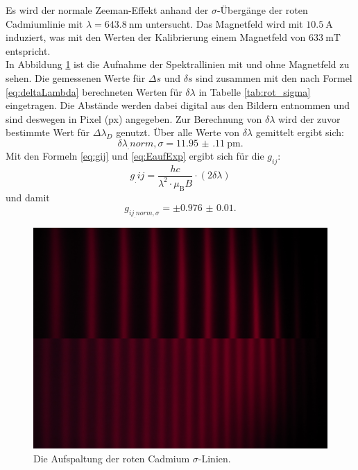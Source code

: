 Es wird der normale Zeeman-Effekt anhand der $\sigma$-Übergänge der roten Cadmiumlinie mit $\lambda=\SI{643.8}{\nano\metre}$ untersucht. Das Magnetfeld wird mit $\SI{10.5}{\ampere}$ induziert, was mit den Werten der Kalibrierung einem Magnetfeld von $\SI{633}{\milli\tesla}$ entspricht.\\
In Abbildung \ref{fig:rot_sigma} ist die Aufnahme der Spektrallinien mit und ohne Magnetfeld zu sehen. Die gemessenen Werte für $\Delta s$ und $\delta s$ sind zusammen mit den nach Formel \eqref{eq:deltaLambda} berechneten Werten für $\delta\lambda$ in Tabelle \ref{tab:rot_sigma} eingetragen. Die Abstände werden dabei digital aus den Bildern entnommen und sind deswegen in Pixel (px) angegeben. Zur Berechnung von $\delta\lambda$ wird der zuvor bestimmte Wert für $\Delta\lambda_D$ genutzt.
Über alle Werte von $\delta\lambda$ gemittelt ergibt sich:
\[
\delta\lambda_.{norm,\sigma} = \SI{11.95(11)}{\pico\metre}\text{.}
\]
Mit den Formeln \eqref{eq:gij} und \eqref{eq:EaufExp} ergibt sich für die $g_{ij}$:
\begin{equation}
g_.{ij}=\frac{h c}{\lambda^2 \cdot \mu_\text{B} B} \cdot (2\delta \lambda) \label{eq:exgj}
\end{equation}
und damit
\[
g_{ij_.{norm,\sigma}} = \pm\num{0.976(10)}\text{.}
\]

\begin{figure}
	\centering
	\includegraphics[width=\linewidth-130pt,height=\textheight-130pt,keepaspectratio]{content/images/rot_sigma.jpg}
	\caption{Die Aufspaltung der roten Cadmium $\sigma$-Linien.}
	\label{fig:rot_sigma}
\end{figure}

